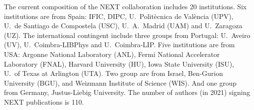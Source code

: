  

 


 \indent
 
The current composition of the NEXT collaboration includes 20 institutions. Six institutions are from Spain:  IFIC, DIPC, U.~Polit\`ecnica de Val\`encia (UPV), U.~de Santiago de Compostela (USC), U.~A.~Madrid (UAM) and U.~Zaragoza (UZ). The international contingent include three groups from Portugal: U.~Aveiro (UV), U.~Coimbra-LIBPhys and U.~Coimbra-LIP. Five institutions are from USA: Argonne National Laboratory (ANL), Fermi National Accelerator Laboratory (FNAL), Harvard University (HU), Iowa State University (ISU), U.~of Texas at Arlington (UTA). Two group are from Israel, Ben-Gurion University (BGU), and Weizmann Institute of Science (WIS). And one group from Germany, Justus-Liebig University. The number of authors (in 2021) signing NEXT publications is 110. 

